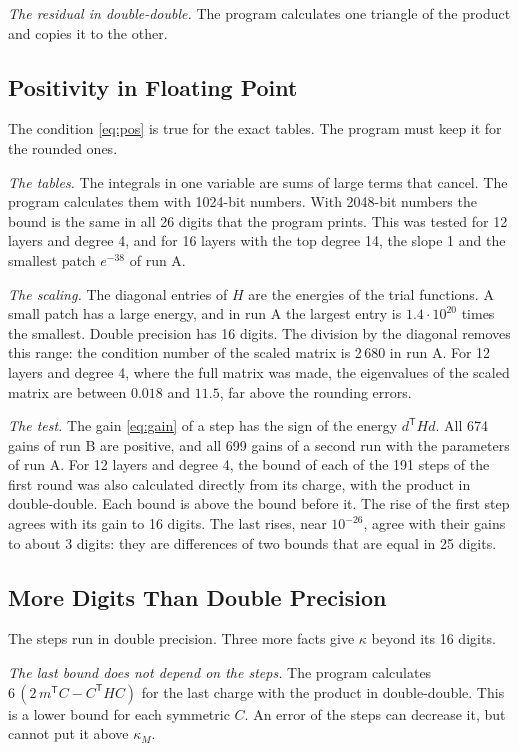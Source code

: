 \documentclass[journal]{IEEEtran}
\newcommand{\T}{\mathsf T}
\begin{document}
\emph{The residual in double-double.} The program calculates one triangle of the product and copies it to the other.

\subsection{Positivity in Floating Point}
The condition \eqref{eq:pos} is true for the exact tables. The program must keep it for the rounded ones.

\emph{The tables.} The integrals in one variable are sums of large terms that cancel. The program calculates them with 1024-bit numbers. With 2048-bit numbers the bound is the same in all 26 digits that the program prints. This was tested for 12 layers and degree 4, and for 16 layers with the top degree 14, the slope 1 and the smallest patch $e^{-38}$ of run A.

\emph{The scaling.} The diagonal entries of $H$ are the energies of the trial functions. A small patch has a large energy, and in run A the largest entry is $1.4\cdot10^{20}$ times the smallest. Double precision has 16 digits. The division by the diagonal removes this range: the condition number of the scaled matrix is 2\,680 in run A. For 12 layers and degree 4, where the full matrix was made, the eigenvalues of the scaled matrix are between $0.018$ and $11.5$, far above the rounding errors.

\emph{The test.} The gain \eqref{eq:gain} of a step has the sign of the energy $d^{\T}Hd$. All 674 gains of run B are positive, and all 699 gains of a second run with the parameters of run A. For 12 layers and degree 4, the bound of each of the 191 steps of the first round was also calculated directly from its charge, with the product in double-double. Each bound is above the bound before it. The rise of the first step agrees with its gain to 16 digits. The last rises, near $10^{-26}$, agree with their gains to about 3 digits: they are differences of two bounds that are equal in 25 digits.

\subsection{More Digits Than Double Precision}
The steps run in double precision. Three more facts give $\kappa$ beyond its 16 digits.

\emph{The last bound does not depend on the steps.} The program calculates $6\,(2\,m^{\T}C - C^{\T}HC)$ for the last charge with the product in double-double. This is a lower bound for each symmetric $C$. An error of the steps can decrease it, but cannot put it above $\kappa_M$.
\end{document}

